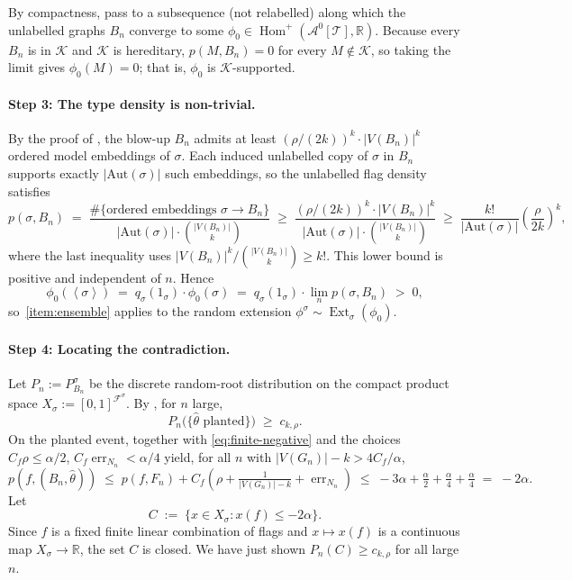 \documentclass[11pt]{article}
\theoremstyle{definition}
\newcommand{\R}{\mathbb{R}}
\newcommand{\A}{\mathcal{A}}
\newcommand{\F}{\mathcal{F}}
\newcommand{\K}{\mathcal{K}}
\newcommand{\T}{\mathcal{T}}
\newcommand{\Homp}{\operatorname{Hom}^{+}}
\newcommand{\Ext}{\operatorname{Ext}}
\newcommand{\brak}[1]{\left\langle #1\right\rangle}
\begin{document}
By compactness, pass to a subsequence (not relabelled) along which the
unlabelled graphs $B_n$ converge to some
$\phi_0\in\Homp(\A^0[\T],\R)$.  Because every $B_n$ is in $\K$ and $\K$
is hereditary, $p(M,B_n)=0$ for every $M\notin\K$, so taking the limit
gives $\phi_0(M)=0$; that is, $\phi_0$ is $\K$-supported.

\paragraph{Step 3: The type density is non-trivial.}
By the proof of , the blow-up $B_n$ admits at
least $(\rho/(2k))^k\cdot|V(B_n)|^k$ ordered model embeddings of
$\sigma$.  Each induced unlabelled copy of $\sigma$ in $B_n$ supports
exactly $|\mathrm{Aut}(\sigma)|$ such embeddings, so the unlabelled flag
density satisfies
\[
  p(\sigma, B_n)
  \;=\; \frac{\#\{\text{ordered embeddings }\sigma\to B_n\}}
              {|\mathrm{Aut}(\sigma)|\cdot\binom{|V(B_n)|}{k}}
  \;\ge\; \frac{(\rho/(2k))^k\cdot|V(B_n)|^k}{|\mathrm{Aut}(\sigma)|\cdot\binom{|V(B_n)|}{k}}
  \;\ge\; \frac{k!}{|\mathrm{Aut}(\sigma)|}\left(\frac{\rho}{2k}\right)^{\!k},
\]
where the last inequality uses
$|V(B_n)|^k/\binom{|V(B_n)|}{k}\ge k!$.  This lower bound is positive and
independent of $n$.  Hence
\[
  \phi_0(\brak\sigma)
  \;=\; q_\sigma(1_\sigma)\cdot \phi_0(\sigma)
  \;=\; q_\sigma(1_\sigma)\cdot\lim_n p(\sigma,B_n)
  \;>\;0,
\]
so~\ref{item:ensemble} applies to the random extension
$\phi^\sigma\sim\Ext_\sigma(\phi_0)$.

\paragraph{Step 4: Locating the contradiction.}
Let $P_n:=P^\sigma_{B_n}$ be the discrete random-root distribution on
the compact product space $X_\sigma:=[0,1]^{\F^\sigma}$.  By
, for $n$ large,
\[
  P_n\bigl(\bigl\{\widehat\theta\text{ planted}\bigr\}\bigr)
  \;\ge\; c_{k,\rho}.
\]
On the planted event,  together with
\eqref{eq:finite-negative} and the choices
$C_f\rho\le\alpha/2$,
$C_f\operatorname{err}_{N_n}<\alpha/4$ yield, for all $n$ with
$|V(G_n)|-k>4C_f/\alpha$,
\[
  p(f,(B_n,\widehat\theta))
  \;\le\; p(f,F_n)+C_f\!\left(\rho+\tfrac1{|V(G_n)|-k}+\operatorname{err}_{N_n}\right)
  \;\le\; -3\alpha+\tfrac\alpha2+\tfrac\alpha4+\tfrac\alpha4
  \;=\; -2\alpha.
\]
Let
\[
  C\;:=\;\{x\in X_\sigma:x(f)\le-2\alpha\}.
\]
Since $f$ is a fixed finite linear combination of flags and
$x\mapsto x(f)$ is a continuous map $X_\sigma\to\R$, the set $C$ is
closed.  We have just shown $P_n(C)\ge c_{k,\rho}$ for all large $n$.
\end{document}
